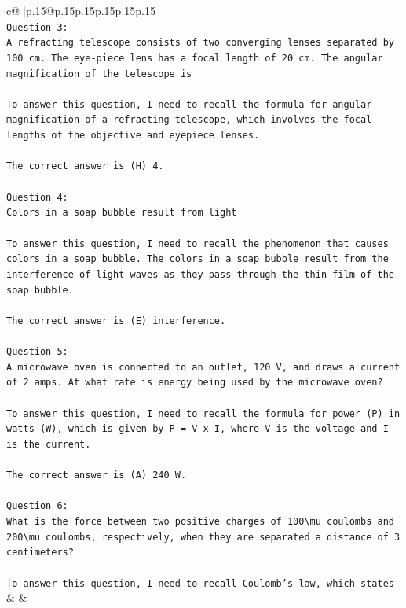 \documentclass{article}
\begin{document}
{\begin{supertabular}{c@{$\;$}|p{.15\linewidth}@{}p{.15\linewidth}p{.15\linewidth}p{.15\linewidth}p{.15\linewidth}p{.15\linewidth}}
{{{\\ 
\texttt{Question 3:} \\
\texttt{A refracting telescope consists of two converging lenses separated by 100 cm. The eye{-}piece lens has a focal length of 20 cm. The angular magnification of the telescope is} \\
\\ 
\texttt{To answer this question, I need to recall the formula for angular magnification of a refracting telescope, which involves the focal lengths of the objective and eyepiece lenses.} \\
\\ 
\texttt{The correct answer is (H) 4.} \\
\\ 
\texttt{Question 4:} \\
\texttt{Colors in a soap bubble result from light} \\
\\ 
\texttt{To answer this question, I need to recall the phenomenon that causes colors in a soap bubble. The colors in a soap bubble result from the interference of light waves as they pass through the thin film of the soap bubble.} \\
\\ 
\texttt{The correct answer is (E) interference.} \\
\\ 
\texttt{Question 5:} \\
\texttt{A microwave oven is connected to an outlet, 120 V, and draws a current of 2 amps. At what rate is energy being used by the microwave oven?} \\
\\ 
\texttt{To answer this question, I need to recall the formula for power (P) in watts (W), which is given by P = V x I, where V is the voltage and I is the current.} \\
\\ 
\texttt{The correct answer is (A) 240 W.} \\
\\ 
\texttt{Question 6:} \\
\texttt{What is the force between two positive charges of 100\textbackslash{}mu coulombs and 200\textbackslash{}mu coulombs, respectively, when they are separated a distance of 3 centimeters?} \\
\\ 
\texttt{To answer this question, I need to recall Coulomb's law, which states} \\
            }
        }
    }
    & & \\ \\


\end{supertabular}}
\end{document}
